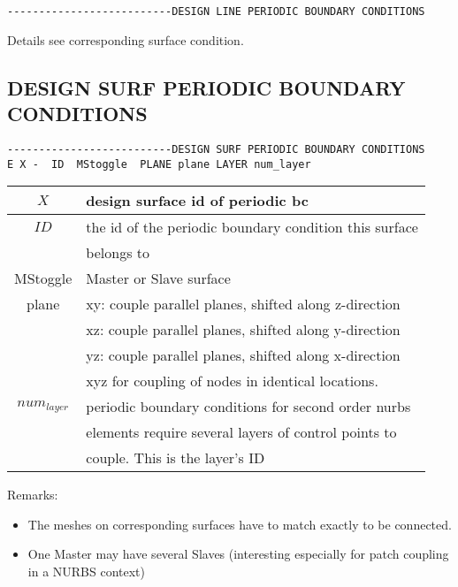 \begin{verbatim}
--------------------------DESIGN LINE PERIODIC BOUNDARY CONDITIONS
\end{verbatim}

Details see corresponding surface condition.

\subsection{DESIGN SURF PERIODIC BOUNDARY CONDITIONS}

\begin{verbatim}
--------------------------DESIGN SURF PERIODIC BOUNDARY CONDITIONS
E X -  ID  MStoggle  PLANE plane LAYER num_layer
\end{verbatim}

\begin{center}
\begin{tabular}{c||l}
$X$            & design surface id of periodic bc                      \\ \hline
$ID$           & the id of the periodic boundary condition this surface\\
               & belongs to                                            \\ \hline
MStoggle       & Master or Slave surface                               \\ \hline
plane          & xy: couple parallel planes, shifted along z-direction \\ 
               & xz: couple parallel planes, shifted along y-direction \\ 
               & yz: couple parallel planes, shifted along x-direction \\ 
               & xyz for coupling of nodes in identical locations.     \\ \hline
$num_{layer}$  & periodic boundary conditions for second order nurbs   \\
               & elements require several layers of control points to  \\
               & couple. This is the layer's ID
\end{tabular}
\end{center}

Remarks:
\begin{itemize}
\item The meshes on corresponding surfaces have to match exactly to be connected. 
\item One Master may have several Slaves (interesting especially for patch 
coupling in a NURBS context)
\end{itemize}

